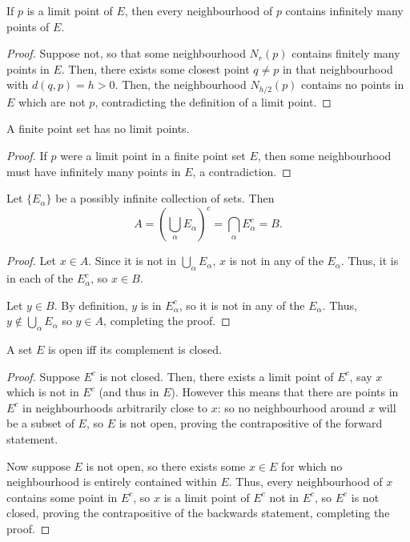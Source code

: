 \begin{theorem}
If $p$ is a limit point of $E$, then every neighbourhood of $p$ contains infinitely many points of $E$. 

\begin{proof}
Suppose not, so that some neighbourhood $N_r(p)$ contains finitely many points in $E$. Then, there exists some closest point $q \ne p$ in that neighbourhood with $d(q, p) = h > 0$. Then, the neighbourhood $N_{h/2}(p)$ contains no points in $E$ which are not $p$, contradicting the definition of a limit point.
\end{proof}
\end{theorem}

\begin{corollary}
A finite point set has no limit points.

\begin{proof}
If $p$ were a limit point in a finite point set $E$, then some neighbourhood must have infinitely many points in $E$, a contradiction.
\end{proof}
\end{corollary}

\begin{theorem}
Let $\{E_{\alpha}\}$ be a possibly infinite collection of sets. Then
\[
	A = \left( \bigcup_{\alpha} E_\alpha \right)^c = \bigcap_{\alpha} E_\alpha^c = B.
\]

\begin{proof}
Let $x \in A$. Since it is not in $\bigcup_\alpha E_\alpha$, $x$ is not in any of the $E_\alpha$. Thus, it is in each of the $E_\alpha^c$, so $x \in B$.

Let $y \in B$. By definition, $y$ is in $E_\alpha^c$, so it is not in any of the $E_\alpha$. Thus, $y \not\in \bigcup_\alpha E_\alpha$ so $y \in A$, completing the proof.
\end{proof}
\end{theorem}

\begin{theorem}
A set $E$ is open iff its complement is closed.

\begin{proof}
Suppose $E^c$ is not closed. Then, there exists a limit point of $E^c$, say $x$ which is not in $E^c$ (and thus in $E$). However this means that there are points in $E^c$ in neighbourhoods arbitrarily close to $x$: so no neighbourhood around $x$ will be a subset of $E$, so $E$ is not open, proving the contrapositive of the forward statement.

Now suppose $E$ is not open, so there exists some $x \in E$ for which no neighbourhood is entirely contained within $E$. Thus, every neighbourhood of $x$ contains some point in $E^c$, so $x$ is a limit point of $E^c$ not in $E^c$, so $E^c$ is not closed, proving the contrapositive of the backwards statement, completing the proof.
\end{proof}
\end{theorem}

